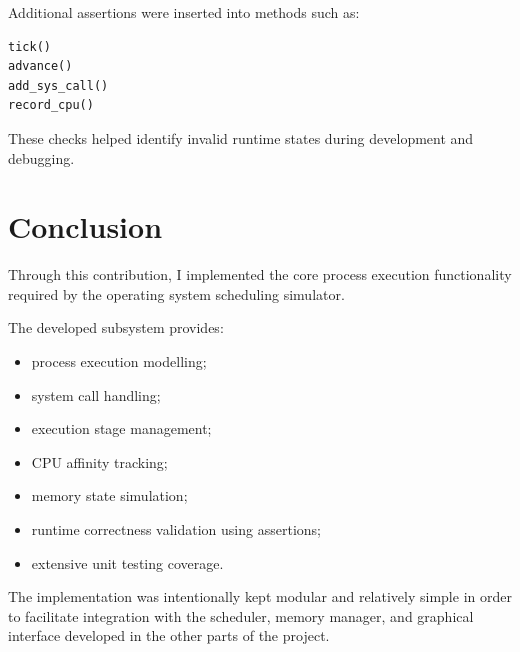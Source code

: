 \documentclass{article}
\begin{document}
Additional assertions were inserted into methods such as:

\begin{verbatim}
tick()
advance()
add_sys_call()
record_cpu()
\end{verbatim}

These checks helped identify invalid runtime states during development and debugging.



\section{Conclusion}

Through this contribution, I implemented the core process execution functionality required by the operating system scheduling simulator.

The developed subsystem provides:

\begin{itemize}
    \item process execution modelling;
    \item system call handling;
    \item execution stage management;
    \item CPU affinity tracking;
    \item memory state simulation;
    \item runtime correctness validation using assertions;
    \item extensive unit testing coverage.
\end{itemize}

The implementation was intentionally kept modular and relatively simple in order to facilitate integration with the scheduler, memory manager, and graphical interface developed in the other parts of the project.
\end{document}
